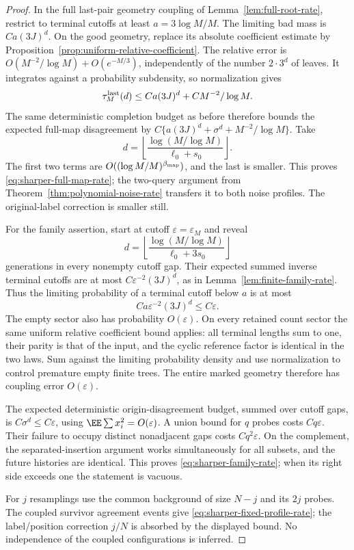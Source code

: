 \documentclass[11pt,letterpaper]{article}
\begin{document}
\begin{proof}
In the full last-pair geometry coupling of
Lemma~\ref{lem:full-root-rate}, restrict to terminal cutoffs at
least $a=3\log M/M$. The limiting bad mass is
$Ca(3J)^d$. On the good geometry, replace its absolute coefficient
estimate by Proposition~\ref{prop:uniform-relative-coefficient}.
The relative error is $O(M^{-2}/\log M)+O(e^{-M/3})$, independently
of the number $2\cdot3^d$ of leaves. It integrates against a
probability subdensity, so normalization gives
\[
 \tau_M^{\rm last}(d)
       \le Ca(3J)^d+CM^{-2}/\log M.
\]
The same deterministic completion budget as before therefore
bounds the expected full-map disagreement by
$C\{a(3J)^d+\sigma^d+M^{-2}/\log M\}$.
Take
\[
 d=\left\lfloor
       \frac{\log(M/\log M)}{\ell_0+s_0}\right\rfloor.
\]
The first two terms are $O((\log M/M)^{\beta_{\rm map}})$,
and the last is smaller. This proves
\eqref{eq:sharper-full-map-rate}; the two-query argument from
Theorem~\ref{thm:polynomial-noise-rate} transfers it to both noise
profiles. The original-label correction is smaller still.

For the family assertion, start at cutoff
$\varepsilon=\varepsilon_M$ and reveal
\[
 d=\left\lfloor
       \frac{\log(M/\log M)}{\ell_0+3s_0}\right\rfloor
\]
generations in every nonempty cutoff gap. Their expected summed
inverse terminal cutoffs are at most
$C\varepsilon^{-2}(3J)^d$, as in
Lemma~\ref{lem:finite-family-rate}. Thus the limiting probability
of a terminal cutoff below $a$ is at most
\[
 Ca\varepsilon^{-2}(3J)^d\le C\varepsilon.
\]
The empty sector also has probability $O(\varepsilon)$.
On every retained count sector the same uniform relative
coefficient bound applies: all terminal lengths sum to one,
their parity is that of the input, and the cyclic reference
factor is identical in the two laws. Sum against the limiting
probability density and use normalization to control premature
empty finite trees. The entire marked geometry therefore has
coupling error $O(\varepsilon)$.

The expected deterministic origin-disagreement budget, summed
over cutoff gaps, is $C\sigma^d\le C\varepsilon$, using
$\EE\sum x_i^2=O(\varepsilon)$. A union bound for $q$ probes
costs $Cq\varepsilon$. Their failure to occupy distinct
nonadjacent gaps costs $Cq^2\varepsilon$. On the complement,
the separated-insertion argument works simultaneously for all
subsets, and the future histories are identical. This proves
\eqref{eq:sharper-family-rate}; when its right side exceeds one
the statement is vacuous.

For $j$ resamplings use the common background of size $N-j$
and its $2j$ probes. The coupled survivor agreement events give
\eqref{eq:sharper-fixed-profile-rate}; the label/position correction
$j/N$ is absorbed by the displayed bound. No independence of
the coupled configurations is inferred.
\end{proof}
\end{document}
